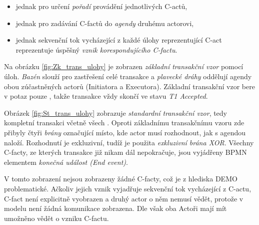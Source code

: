 \begin{itemize}
\item jednak pro určení \textit{pořadí} provádění jednotlivých C-actů,
\item jednak pro zadávání C-factů do \textit{agendy} druhému actorovi,
\item jednak sekvenční tok vycházející z každé úlohy reprezentující C-act reprezentuje úspěšný \textit{vznik korespondujícího C-factu}.
\end{itemize}

Na obrázku \ref{fig:Zk_trans_ulohy} je zobrazen \textit{základní transakční vzor} pomocí úloh. \textit{Bazén} slouží pro zastřešení celé transakce a \textit{plavecké dráhy} oddělují agendy obou zúčastněných actorů (Initiatora a Executora). Základní transakční vzor bere v potaz pouze , takže transakce vždy skončí ve stavu \textit{T1 Accepted}.

Obrázek \ref{fig:St_trans_ulohy} zobrazuje \textit{standardní transakční vzor}, tedy kompletní transakci včetně všech . Oproti základnímu transakčnímu vzoru zde přibyly čtyři \textit{brány} označující místo, kde actor musí rozhodnout, jak s agendou naloží. Rozhodnutí je exkluzivní, tudíž je použita \textit{exkluzivní brána XOR}. Všechny C-facty, ze kterých transakce již nikam dál nepokračuje, jsou vyjádřeny BPMN elementem \textit{konečná událost (End event)}.

V tomto zobrazení nejsou zobrazeny žádné C-facty, což je z hlediska DEMO problematické. Ačkoliv jejich vznik vyjadřuje sekvenční tok vycházející z C-actu, C-fact není explicitně vyobrazen a druhý actor o něm nemusí vědět, protože v modelu není žádná komunikace zobrazena. Dle \cite{Dietz2006} však oba Actoři mají mít umožněno vědět o vzniku C-factu.

